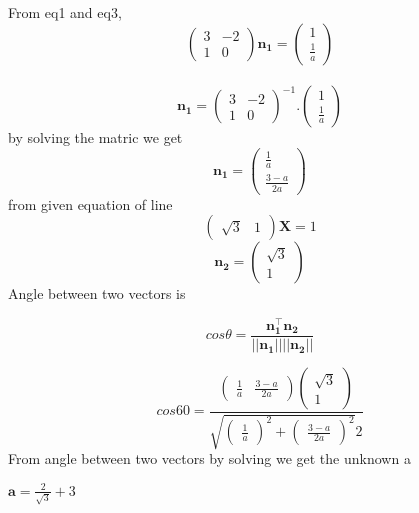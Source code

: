 \documentclass[journal,12pt,twocolumn]{article}
\newcommand{\myvec}[1]{\ensuremath{\begin{pmatrix}#1\end{pmatrix}}}
\let\vec\mathbf
\begin{document}
From eq1 and eq3,\\
\begin{equation}
	\myvec{
  3 & -2\\
  1 & 0
}\vec{n_1}
  = \myvec{1\\
  \frac{1}{a}}   \label{eq-4}
\end{equation}
\\
\begin{equation}
	 \vec{n_1} = 
	 \myvec{
  3 & -2\\
  1 & 0
 }
  ^{-1}
  .
	 \myvec{
  1\\
  \frac{1}{a}}
  \label{eq-7}
\end{equation}
by solving the matric we get \\
\begin{equation}
	\vec{n_1}=
	\myvec{
  \frac{1}{a}  \\  
  \frac{3-a}{2a}}
  \label{eq-8}  
\end{equation}
from given equation of line
\begin{equation}
\myvec{\sqrt{3} & 1}\vec{X}=1
\end{equation}
\begin{equation}
\vec{n_2}=\myvec{\sqrt{3} \\ 1}
\end{equation}
 Angle between two vectors is
 
 \vspace{0.2cm}
 \begin{equation}
 cos\theta=\frac{\vec{n_1^{\top}} \vec{n_2}}{||\vec{n_1}||||\vec{n_2}||}
\end{equation} 

\begin{equation}
 cos60=\frac{\myvec{
  \frac{1}{a}&
  \frac{3-a}{2a}}   \myvec{
 \sqrt{3}\\
 1}}{\sqrt{\myvec{
  \frac{1}{a}}^{2}+\myvec{
  \frac{3-a}{2a}}^{2}}2}
\end{equation}
From angle between two vectors by solving we get the unknown a
\begin{center}
 $\textbf{a}=\frac{2}{\sqrt{3}}+3$
 \end{center} 
 
\end{document}
